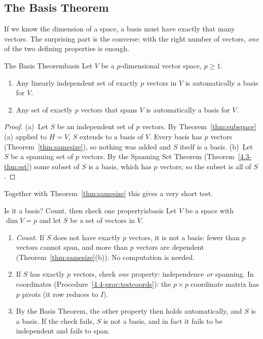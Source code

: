 \documentclass[11pt]{article}
\begin{document}
\subsection*{The Basis Theorem}

If we know the dimension of a space, a basis must have exactly that many vectors. The surprising part is the converse: with the right number of vectors, \emph{one} of the two defining properties is enough.

\begin{thm}{The Basis Theorem}{basis}
Let $V$ be a $p$-dimensional vector space, $p\ge1$.
\begin{enumerate}[label=(\alph*),itemsep=1pt]
  \item Any linearly independent set of exactly $p$ vectors in $V$ is automatically a basis for $V$.
  \item Any set of exactly $p$ vectors that spans $V$ is automatically a basis for $V$.
\end{enumerate}
\end{thm}

\begin{proof}
(a)~Let $S$ be an independent set of $p$ vectors. By Theorem~\ref{thm:subspace}(a) applied to $H=V$, $S$ extends to a basis of $V$. Every basis has $p$ vectors (Theorem~\ref{thm:samesize}), so nothing was added and $S$ itself is a basis. (b)~Let $S$ be a spanning set of $p$ vectors. By the Spanning Set Theorem (Theorem~\ref{4.3-thm:sst}) some subset of $S$ is a basis, which has $p$ vectors; so the subset is all of $S$.
\end{proof}

Together with Theorem~\ref{thm:samesize} this gives a very short test.

\begin{proc}{Is it a basis? Count, then check one property}{isbasis}
Let $V$ be a space with $\dim V=p$ and let $S$ be a set of vectors in $V$.
\begin{enumerate}
  \item \emph{Count.} If $S$ does not have exactly $p$ vectors, it is not a basis: fewer than $p$ vectors cannot span, and more than $p$ vectors are dependent (Theorem~\ref{thm:samesize}(b)). No computation is needed.
  \item If $S$ has exactly $p$ vectors, check \emph{one} property: independence \emph{or} spanning. In coordinates (Procedure~\ref{4.4-proc:testcoords}): the $p\times p$ coordinate matrix has $p$ pivots (it row reduces to $I$).
  \item By the Basis Theorem, the other property then holds automatically, and $S$ is a basis. If the check fails, $S$ is not a basis, and in fact it fails to be independent and fails to span.
\end{enumerate}
\end{proc}
\end{document}
